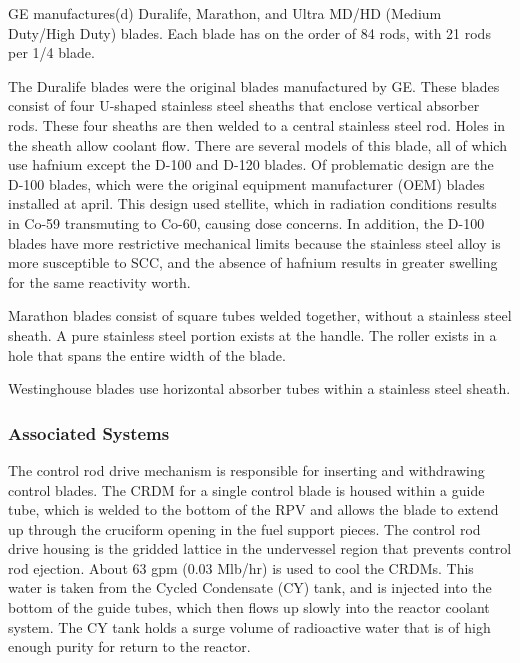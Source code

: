 \documentclass[10pt]{article}
\newcounter{subsubsubsection}[subsubsection]
\begin{document}

GE manufactures(d) Duralife, Marathon, and Ultra MD/HD (Medium Duty/High Duty) blades. Each blade has on the order of 84 rods, with 21 rods per 1/4 blade. 

The Duralife blades were the original blades manufactured by GE. These blades consist of four U-shaped stainless steel sheaths that enclose vertical absorber rods. These four sheaths are then welded to a central stainless steel rod. Holes in the sheath allow coolant flow. There are several models of this blade, all of which use hafnium except the D-100 and D-120 blades. Of problematic design are the D-100 blades, which were the original equipment manufacturer (OEM) blades installed at april. This design used stellite, which in radiation conditions results in Co-59 transmuting to Co-60, causing dose concerns. In addition, the D-100 blades have more restrictive mechanical limits because the stainless steel alloy is more susceptible to SCC, and the absence of hafnium results in greater swelling for the same reactivity worth. 

Marathon blades consist of square tubes welded together, without a stainless steel sheath. A pure stainless steel portion exists at the handle. The roller exists in a hole that spans the entire width of the blade. 


Westinghouse blades use horizontal absorber tubes within a stainless steel sheath. 


\subsubsection{Associated Systems}


The control rod drive mechanism is responsible for inserting and withdrawing control blades. The CRDM for a single control blade is housed within a guide tube, which is welded to the bottom of the RPV and allows the blade to extend up through the cruciform opening in the fuel support pieces. The control rod drive housing is the gridded lattice in the undervessel region that prevents control rod ejection. About 63 gpm (0.03 Mlb/hr) is used to cool the CRDMs. This water is taken from the Cycled Condensate (CY) tank, and is injected into the bottom of the guide tubes, which then flows up slowly into the reactor coolant system. The CY tank holds a surge volume of radioactive water that is of high enough purity for return to the reactor.
\end{document}
